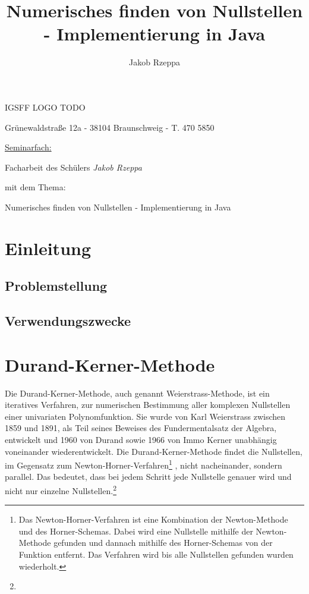 \documentclass[12pt]{article}
\title{Numerisches finden von Nullstellen - Implementierung in Java}
\author{Jakob Rzeppa}
\begin{document}
\begin{titlepage}
	\centering
    {\huge IGSFF LOGO TODO\par}
	{Grünewaldstraße 12a - 38104 Braunschweig - T. 470 5850\par}
	\vspace{1cm}
	{\underline{Seminarfach:}\par}
	\vspace{1cm}
    {\large Facharbeit des Schülers \textit{Jakob Rzeppa} \par mit dem Thema: \par}
    \vspace{1.5cm}
	{\huge Numerisches finden von Nullstellen - Implementierung in Java\par}
	\vspace{2cm}
\end{titlepage}

\tableofcontents

\section{Einleitung}
    \subsection{Problemstellung}
    \subsection{Verwendungszwecke}

\section{Durand-Kerner-Methode}
Die Durand-Kerner-Methode, auch genannt Weierstrass-Methode, ist ein iteratives Verfahren, zur numerischen Bestimmung aller komplexen Nullstellen einer univariaten Polynomfunktion.
Sie wurde von Karl Weierstrass zwischen 1859 und 1891, als Teil seines Beweises des Fundermentalsatz der Algebra, entwickelt und 1960 von Durand sowie 1966 von Immo Kerner unabhängig voneinander wiederentwickelt.
Die Durand-Kerner-Methode findet die Nullstellen, im Gegensatz zum Newton-Horner-Verfahren\footnote{
    Das Newton-Horner-Verfahren ist eine Kombination der Newton-Methode und des Horner-Schemas. Dabei wird eine Nullstelle mithilfe der Newton-Methode gefunden und dannach mithilfe des Horner-Schemas von der Funktion entfernt. Das Verfahren wird bis alle Nullstellen gefunden wurden wiederholt.
}
, nicht nacheinander, sondern parallel. Das bedeutet, dass bei jedem Schritt jede Nullstelle genauer wird und nicht nur einzelne Nullstellen.\footnote{

}
\end{document}
